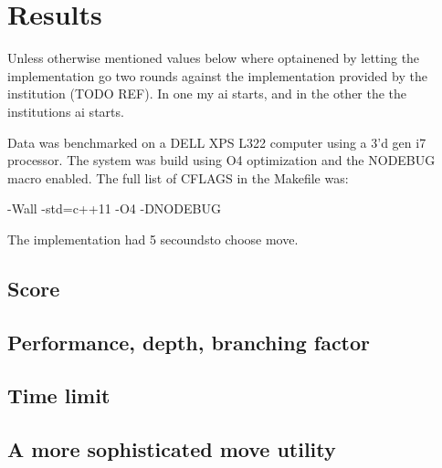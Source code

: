 \documentclass[a4paper,11pt]{article}
\begin{document}
\section{Results}
Unless otherwise mentioned values below where optainened by letting the implementation go two rounds against the implementation provided by the institution (TODO REF). In one my ai starts, and in the other the the institutions ai starts.

Data was benchmarked on a DELL XPS L322 computer using a 3'd gen i7 processor. The system was build using O4 optimization and the NODEBUG macro enabled. The full list of CFLAGS in the Makefile was:

-Wall -std=c++11 -O4 -DNODEBUG

The implementation had 5 secoundsto choose move.

\subsection{Score}
\subsection{Performance, depth, branching factor}
\subsection{Time limit}
\subsection{A more sophisticated move utility}
\end{document}

